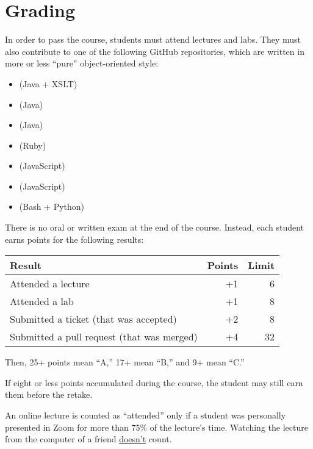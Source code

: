 \documentclass[nobrand,anonymous,nodate,nosecurity]{huawei}
\begin{document}
\newpage
\section*{Grading}

In order to pass the course, students must attend lectures and labs.
They must also contribute to one of the following GitHub repositories, which are written in more or less ``pure'' object-oriented style:

\begin{itemize}
    \item \href{https://github.com/objectionary/eo}{} (Java + XSLT)
    \item \href{https://github.com/yegor256/cactoos}{} (Java)
    \item \href{https://github.com/yegor256/takes}{} (Java)
    \item \href{https://github.com/yegor256/factbase}{} (Ruby)
    \item \href{https://github.com/objectionary/eoc}{} (JavaScript)
    \item \href{https://github.com/objectionary/eo2js}{} (JavaScript)
    \item \href{https://github.com/yegor256/cam}{} (Bash + Python)
\end{itemize}

There is no oral or written exam at the end of the course.
Instead, each student earns points for the following results:

\renewcommand{\arraystretch}{1}
\begin{tabular}{lrr}
\toprule
Result & Points & Limit \\
\midrule
Attended a lecture & +1 & 6 \\
Attended a lab & +1 & 8 \\
Submitted a ticket (that was accepted) & +2 & 8 \\
Submitted a pull request (that was merged) & +4 & 32 \\
\bottomrule
\end{tabular}

Then, 25+ points mean ``A,'' 17+ mean ``B,'' and 9+ mean ``C.''

If eight or less points accumulated during the course, the student may still earn them before the retake.

An online lecture is counted as ``attended'' only if a student was personally presented in Zoom for more than 75\% of the lecture's time.
Watching the lecture from the computer of a friend \ul{doesn't} count.
\end{document}

